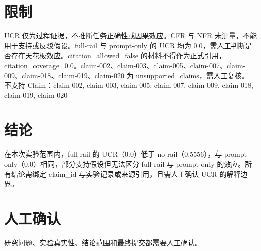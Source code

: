 \documentclass[UTF8]{ctexart}
\begin{document}
\section{限制}
UCR 仅为过程证据，不推断任务正确性或因果效应。CFR 与 NFR 未测量，不能用于支持或反驳假设。full-\allowbreak{}rail 与 prompt-\allowbreak{}only 的 UCR 均为 0.0，需人工判断是否存在天花板效应。citation\_\allowbreak{}allowed=false 的材料不得作为正式引用，citation\_\allowbreak{}coverage=0.0。claim-\allowbreak{}002、claim-\allowbreak{}003、claim-\allowbreak{}005、claim-\allowbreak{}007、claim-\allowbreak{}009、claim-\allowbreak{}018、claim-\allowbreak{}019、claim-\allowbreak{}020 为 unsupported\_\allowbreak{}claims，需人工复核。\\
不支持 Claim：claim-\allowbreak{}002, claim-\allowbreak{}003, claim-\allowbreak{}005, claim-\allowbreak{}007, claim-\allowbreak{}009, claim-\allowbreak{}018, claim-\allowbreak{}019, claim-\allowbreak{}020
\section{结论}
在本次实验范围内，full-\allowbreak{}rail 的 UCR（0.0）低于 no-\allowbreak{}rail（0.5556），与 prompt-\allowbreak{}only（0.0）相同，部分支持假设但无法区分 full-\allowbreak{}rail 与 prompt-\allowbreak{}only 的效应。所有结论需绑定 claim\_\allowbreak{}id 与实验记录或来源引用，且需人工确认 UCR 的解释边界。
\section{人工确认}
研究问题、实验真实性、结论范围和最终提交都需要人工确认。
\end{document}
